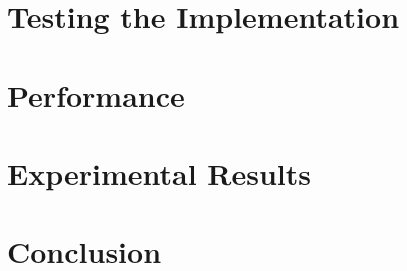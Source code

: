 \documentclass[12pt,twoside]{report}
\begin{document}
\chapter{Testing the Implementation}

\chapter{Performance}


\chapter{Experimental Results}


\chapter{Conclusion}




\end{document}
